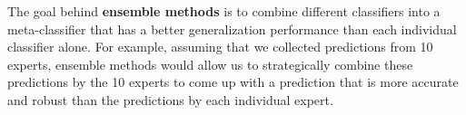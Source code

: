 \documentclass[a4paper,11pt]{article}
\begin{document}



The goal behind \textbf{ensemble methods} is to combine different classifiers into a meta-classifier that has a better generalization performance than each individual classifier alone. For example, assuming that we collected predictions from 10 experts, ensemble methods would allow us to strategically combine these predictions by the 10 experts to come up with a prediction that is more accurate and robust than the predictions by each individual expert.

\end{document}
